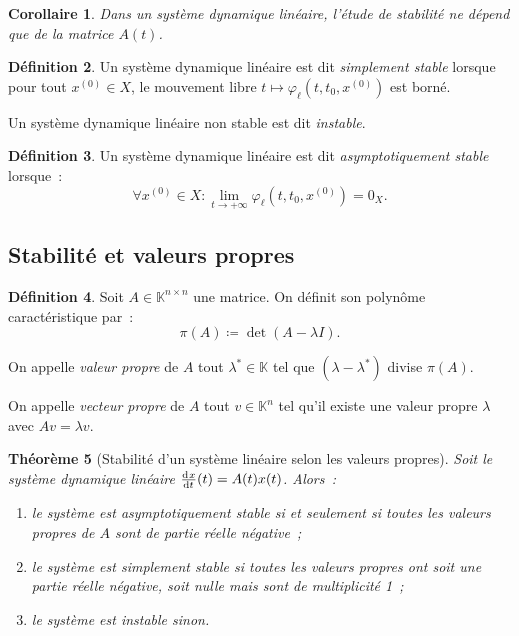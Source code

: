 \documentclass{article}
\newtheorem{thm}{Théorème}[section]
\newtheorem{cor}[thm]{Corollaire}
\theoremstyle{definition}
\newtheorem{déf}[thm]{Définition}
\theoremstyle{remark}
\newcommand{\K}{\mathbb K}
\begin{document}
	\begin{cor} Dans un système dynamique linéaire, l'étude de stabilité ne dépend que de la matrice $A(t)$.
	\end{cor}

	\begin{déf} Un système dynamique linéaire est dit \textit{simplement stable} lorsque pour tout $x^{(0)} \in X$, le mouvement libre
	$t \mapsto \varphi_\ell(t, t_0, x^{(0)})$ est borné.

	Un système dynamique linéaire non stable est dit \textit{instable}.
	\end{déf}

	\begin{déf} Un système dynamique linéaire est dit \textit{asymptotiquement stable} lorsque~:
	\[\forall x^{(0)} \in X : \lim_{t \to +\infty}\varphi_\ell(t, t_0, x^{(0)}) = 0_X.\]
	\end{déf}

	\subsection{Stabilité et valeurs propres}

	\begin{déf} Soit $A \in \K^{n \times n}$ une matrice. On définit son polynôme caractéristique par~:
	\[\pi(A) \coloneqq \det(A - \lambda I).\]

	On appelle \textit{valeur propre} de $A$ tout $\lambda^* \in \K$ tel que $(\lambda - \lambda^*)$ divise $\pi(A)$.

	On appelle \textit{vecteur propre} de $A$ tout $v \in \K^n$ tel qu'il existe une valeur propre $\lambda$ avec $Av = \lambda v$.
	\end{déf}

	\begin{thm}[Stabilité d'un système linéaire selon les valeurs propres] Soit le système dynamique linéaire $\od xt(t) = A(t)x(t)$. Alors~:
	\begin{enumerate}
		\item le système est asymptotiquement stable si et seulement si toutes les valeurs propres de $A$ sont de partie réelle négative~;
		\item le système est simplement stable si toutes les valeurs propres ont soit une partie réelle négative, soit nulle mais sont de multiplicité 1~;
		\item le système est instable sinon.
	\end{enumerate}
	\end{thm}
\end{document}
